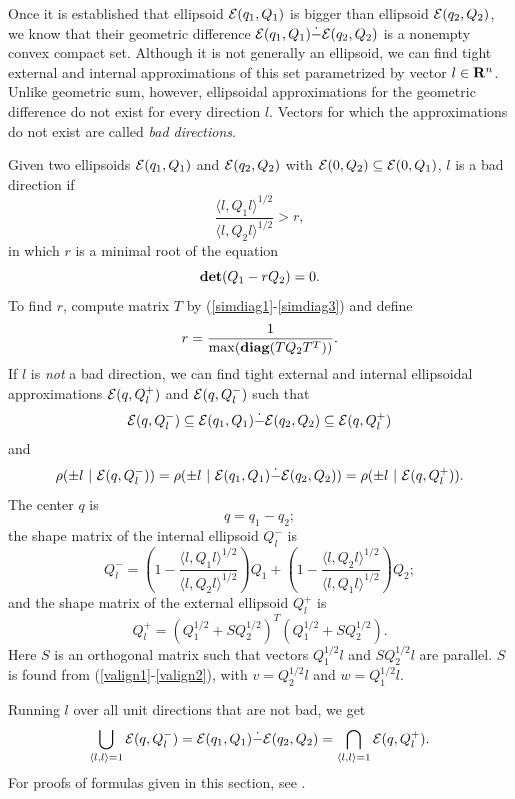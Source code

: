 \documentclass{report}
\newcommand{\EE}{{\cal E}}
\begin{document}
Once it is established that ellipsoid $\EE(q_1,Q_1)$ is bigger than
ellipsoid $\EE(q_2,Q_2)$, we know that their geometric difference
$\EE(q_1,Q_1)\dot{-}\EE(q_2,Q_2)$ is a nonempty convex compact set.
Although  it is not generally an ellipsoid, we can find tight external
and internal approximations of this set parametrized by vector $l\in{\bf R}^n$.
Unlike geometric sum, however, ellipsoidal approximations for the geometric
difference do not exist  for every direction $l$.
Vectors for which the approximations do not exist are called
{\it bad directions}.

Given two ellipsoids $\EE(q_1,Q_1)$ and $\EE(q_2,Q_2)$ with
$\EE(0,Q_2)\subseteq\EE(0,Q_1)$, $l$ is a bad direction if
\[ \frac{\langle l,Q_1l\rangle^{1/2}}{\langle l,Q_2l\rangle^{1/2}}>r, \]
in which $r$ is a minimal root of the equation
\[ {\bf det}(Q_1-rQ_2) = 0. \]
To find $r$, compute matrix $T$ by (\ref{simdiag1}-\ref{simdiag3}) and define
\[ r = \frac{1}{\max({\bf diag}(TQ_2T^T))}. \]
If $l$ is {\it not} a bad direction, we can find tight external
and internal ellipsoidal approximations $\EE(q,Q^+_l)$ and
$\EE(q,Q^-_l)$ such that
\[ \EE(q,Q^-_l)\subseteq\EE(q_1,Q_1)\dot{-}\EE(q_2,Q_2)\subseteq\EE(q,Q^+_l) \]
and
\[ \rho(\pm l ~|~ \EE(q,Q_l^-)) =
\rho(\pm l ~|~ \EE(q_1,Q_1)\dot{-}\EE(q_2,Q_2)) =
\rho(\pm l ~|~ \EE(q,Q_l^+)).\]
The center $q$ is
\begin{equation}
q = q_1 - q_2;  \label{minkdiff_c}
\end{equation}
the shape matrix of the internal ellipsoid $Q^-_l$ is
\begin{equation}
Q^-_l = \left(1-\frac{\langle l,Q_1l\rangle^{1/2}}{\langle l,
Q_2l\rangle^{1/2}}\right)Q_1 +
\left(1 - \frac{\langle l, Q_2l\rangle^{1/2}}{\langle l,
Q_1l\rangle^{1/2}}\right)Q_2; \label{minkdiff_ia}
\end{equation}
and the shape matrix of the external ellipsoid $Q^+_l$ is
\begin{equation}
Q^+_l = \left(Q_1^{1/2} + SQ_2^{1/2}\right)^T
\left(Q_1^{1/2} + SQ_2^{1/2}\right).  \label{minkdiff_ea}
\end{equation}
Here $S$ is an orthogonal matrix such that vectors $Q_1^{1/2}l$
and $SQ_2^{1/2}l$ are parallel.
 $S$ is found from (\ref{valign1}-\ref{valign2}), with
$v=Q_2^{1/2}l$ and $w=Q_1^{1/2}l$.

Running $l$ over all unit directions that are not bad, we get
\[ \bigcup_{\langle l,l\rangle=1} \EE(q,Q_l^-) =
\EE(q_1,Q_1)\dot{-}\EE(q_2,Q_2) =
\bigcap_{\langle l,l\rangle=1} \EE(q,Q_l^+) .\]
For proofs of formulas given in this section, see \cite{kurvalyi}.
\end{document}
